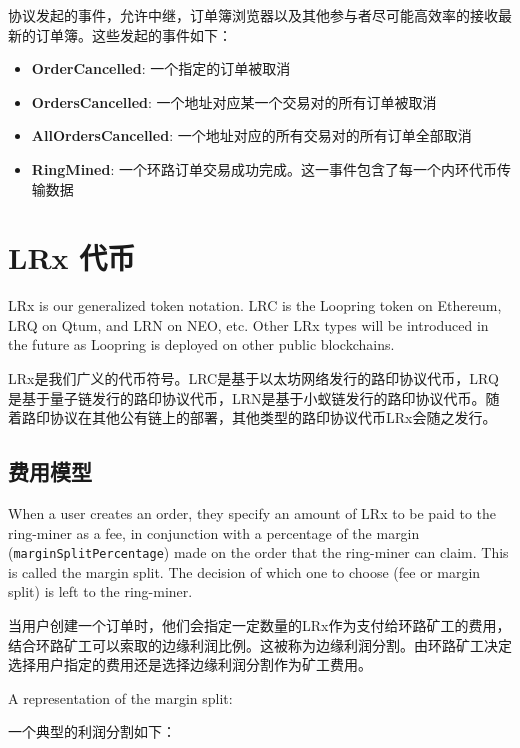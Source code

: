 \documentclass[UTF8,nofonts]{ctexart}
\makeatletter
\newenvironment{figurehere}
 {\def\@captype{figure}}
 {}
\makeatother
\begin{document}
\begin{multicols}{2}
协议发起的事件，允许中继，订单簿浏览器以及其他参与者尽可能高效率的接收最新的订单簿。这些发起的事件如下：


\begin{itemize}
	\item \textbf{OrderCancelled}: 一个指定的订单被取消

	\item \textbf{OrdersCancelled}: 一个地址对应某一个交易对的所有订单被取消
	\item \textbf{AllOrdersCancelled}: 一个地址对应的所有交易对的所有订单全部取消
	\item \textbf{RingMined}: 一个环路订单交易成功完成。这一事件包含了每一个内环代币传  
输数据
\end{itemize}


\section{LRx 代币\label{sec:token}}
LRx is our generalized token notation. LRC is the Loopring token on Ethereum, LRQ on Qtum, and LRN on NEO, etc. Other LRx types will be introduced in the future as Loopring is deployed on other public blockchains.

LRx是我们广义的代币符号。LRC是基于以太坊网络发行的路印协议代币，LRQ是基于量子链发行的路印协议代币，LRN是基于小蚁链发行的路印协议代币。随着路印协议在其他公有链上的部署，其他类型的路印协议代币LRx会随之发行。


\subsection{费用模型\label{sec:fee_model}} 
When a user creates an order, they specify an amount of LRx to be paid to the ring-miner as a fee, in conjunction with a percentage of the margin (\verb|marginSplitPercentage|) made on the order that the ring-miner can claim. This is called the margin split. The decision of which one to choose (fee or margin split) is left to the ring-miner.

当用户创建一个订单时，他们会指定一定数量的LRx作为支付给环路矿工的费用，结合环路矿工可以索取的边缘利润比例。这被称为边缘利润分割。由环路矿工决定选择用户指定的费用还是选择边缘利润分割作为矿工费用。


A representation of the margin split:

一个典型的利润分割如下：


\begin{center}
\begin{figurehere}
\centering
{}
\end{figurehere}
\end{center}
\end{multicols}
\end{document}
